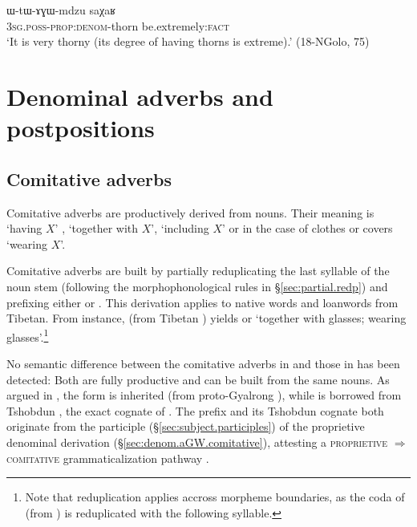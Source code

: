\begin{exe}
\ex \label{ex:WtAGWmdzu}
\gll  ɯ-tɯ-ɤɣɯ-mdzu saχaʁ  \\
\textsc{3sg}.\textsc{poss}-\textsc{prop}:\textsc{denom}-thorn be.extremely:\textsc{fact} \\
\glt `It is very thorny (its degree of having thorns is extreme).' (18-NGolo, 75)
\end{exe}

 
\section{Denominal adverbs and postpositions} \label{sec:denominal.adverb}

\subsection{Comitative adverbs} \label{sec:comitative.adverb}
Comitative adverbs are productively derived from nouns. Their meaning is `having $X$' , `together with $X$', `including $X$' or in the case of clothes or covers `wearing $X$'.

Comitative adverbs are built by partially reduplicating the last syllable of the noun stem (following the morphophonological rules in §\ref{sec:partial.redp}) and prefixing either  or . This derivation applies to native words and loanwords from Tibetan. From instance,  (from Tibetan ) yields  or  `together with glasses; wearing glasses'.\footnote{Note that reduplication applies accross morpheme boundaries, as the coda of  (from ) is reduplicated with the following syllable. } 

No semantic difference between the comitative adverbs in  and those in  has been detected: Both are fully productive and can be built from the same nouns. As argued in \citet{jacques17comitative}, the  form is inherited (from proto-Gyalrong ), while  is borrowed from Tshobdun , the exact cognate of   \citep[107]{jackson98morphology}. The prefix  and its Tshobdun cognate  both originate from the participle  (§\ref{sec:subject.participles}) of the proprietive  denominal derivation (§\ref{sec:denom.aGW.comitative}), attesting a \textsc{proprietive} $\Rightarrow$ \textsc{comitative} grammaticalization pathway  \citep{jacques17comitative}. 

